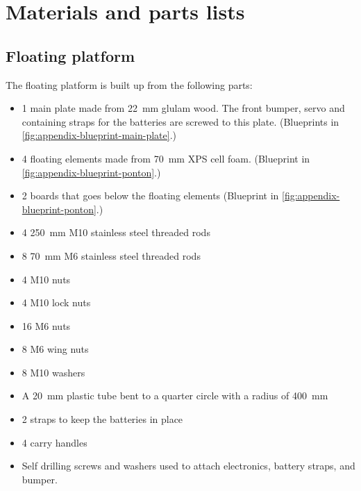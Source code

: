 \section{Materials and parts lists}\label{sec:appendix-a}

\subsection{Floating platform}

The floating platform is built up from the following parts:

\begin{itemize}
  \item 1 main plate made from 22~mm glulam wood. The front bumper,
    servo and containing straps for the batteries are screwed to this plate. (Blueprints in \cref{fig:appendix-blueprint-main-plate}.)
  \item 4 floating elements made from 70~mm XPS cell foam. (Blueprint in \cref{fig:appendix-blueprint-ponton}.)
  \item 2 boards that goes below the floating elements (Blueprint in \cref{fig:appendix-blueprint-ponton}.)
  \item 4 250~mm M10 stainless steel threaded rods
  \item 8 70~mm M6 stainless steel threaded rods
  \item 4 M10 nuts
  \item 4 M10 lock nuts
  \item 16 M6 nuts
  \item 8 M6 wing nuts
  \item 8 M10 washers
  \item A 20~mm plastic tube bent to a quarter circle with a radius of 400~mm
  \item 2 straps to keep the batteries in place
  \item 4 carry handles
  \item Self drilling screws and washers used to attach electronics, battery
    straps, and bumper.
\end{itemize}

